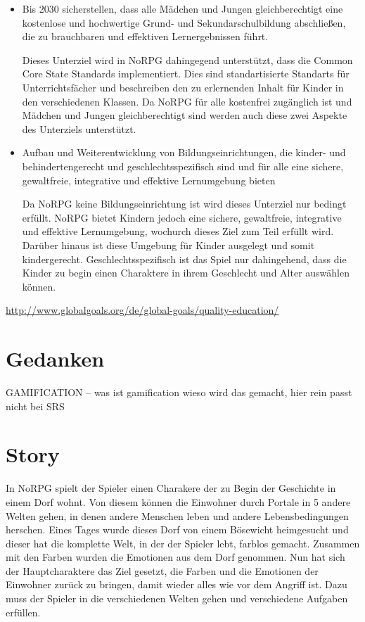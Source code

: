 \begin{itemize}
\item Bis 2030 sicherstellen, dass alle Mädchen und Jungen gleichberechtigt eine kostenlose und hochwertige Grund- und Sekundarschulbildung abschließen, die zu brauchbaren und effektiven Lernergebnissen führt.

Dieses Unterziel wird in NoRPG dahingegend unterstützt, dass die Common Core State Standards implementiert. Dies sind standartisierte Standarts für Unterrichtsfächer und beschreiben den zu erlernenden Inhalt für Kinder in den verschiedenen Klassen. Da NoRPG für alle kostenfrei zugänglich ist und Mädchen und Jungen gleichberechtigt sind werden auch diese zwei Aspekte des Unterziels unterstützt.

\item Aufbau und Weiterentwicklung von Bildungseinrichtungen, die kinder- und behindertengerecht und geschlechtsspezifisch sind und für alle eine sichere, gewaltfreie, integrative und effektive Lernumgebung bieten

Da NoRPG keine Bildungseinrichtung ist wird dieses Unterziel nur bedingt erfüllt. NoRPG bietet Kindern jedoch eine sichere, gewaltfreie, integrative und effektive Lernumgebung, wochurch dieses Ziel zum Teil erfüllt wird. Darüber hinaus ist diese Umgebung für Kinder ausgelegt und somit kindergerecht. Geschlechtsspezifisch ist das Spiel nur dahingehend, dass die Kinder zu begin einen Charaktere in ihrem Geschlecht und Alter auswählen können.

\end{itemize}

	\url{http://www.globalgoals.org/de/global-goals/quality-education/}

	
\section{Gedanken}
	
	GAMIFICATION -- was ist gamification wieso wird das gemacht, hier rein passt nicht bei SRS
	
\section{Story}

In NoRPG spielt der Spieler einen Charakere der zu Begin der Geschichte in einem Dorf wohnt. Von diesem können die Einwohner durch Portale in 5 andere Welten gehen, in denen andere Menschen leben und andere Lebensbedingungen herschen. Eines Tages wurde dieses Dorf von einem Bösewicht heimgesucht und dieser hat die komplette Welt, in der der Spieler lebt, farblos gemacht. Zusammen mit den Farben wurden die Emotionen aus dem Dorf genommen. Nun hat sich der Hauptcharaktere das Ziel gesetzt, die Farben und die Emotionen der Einwohner zurück zu bringen, damit wieder alles wie vor dem Angriff ist. Dazu muss der Spieler in die verschiedenen Welten gehen und verschiedene Aufgaben erfüllen.

